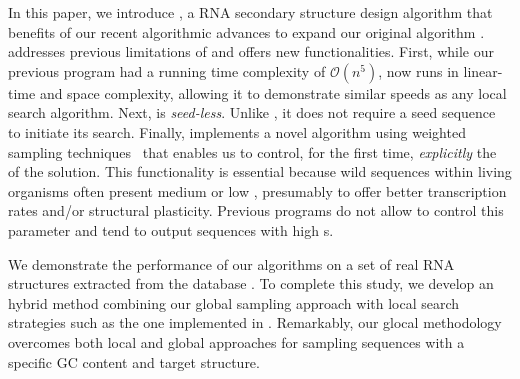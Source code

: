 In this paper, we introduce \ourprog, a RNA secondary structure design algorithm that benefits of our recent algorithmic advances \cite{Reinharz:2013aa} to expand our original \RNAensign algorithm \cite{Levin:2012kx}. \ourprog addresses previous limitations of \RNAensign and offers new functionalities. First, while our previous program had a running time complexity of $\mathcal{O}(n^5)$, \ourprog now runs in linear-time and space complexity, allowing it to demonstrate similar speeds as any local search algorithm. Next, \ourprog is \textit{seed-less}. Unlike \RNAensign, it does not require a seed sequence to initiate its search. Finally, \ourprog implements a novel algorithm using weighted sampling techniques~\cite{Bodini2010} that enables us to control, for the first time, \textit{explicitly} the \GCContent of the solution. This functionality is essential because wild sequences within living organisms often present medium or low \GCContent, presumably to offer better transcription rates and/or structural plasticity. Previous programs do not allow to control this parameter and tend to output sequences with high \GCContent{}s. 

We demonstrate the performance of our algorithms on a set of real RNA structures extracted from the \RNASTRAND database \cite{andronescu2008rna}. To complete this study, we develop an hybrid method combining our global sampling approach with local search strategies such as the one implemented in \RNAinverse.  Remarkably, our glocal methodology overcomes both local and global approaches  for sampling sequences with a specific GC content and target structure.